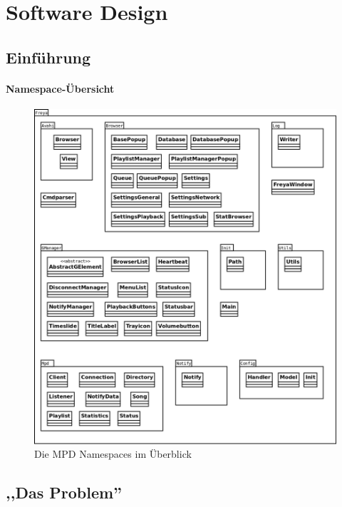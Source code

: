 
\chapter{Software Design}

\section{Einführung}

\subsubsection{Namespace-Übersicht}

\begin{figure}[h!]
    \centering
    \includegraphics[scale=0.27]{Namespace_Uebersicht.png}
    \caption{Die MPD Namespaces im Überblick}
    \label{dd_namespaces}
\end{figure}

\section{,,Das Problem''}

